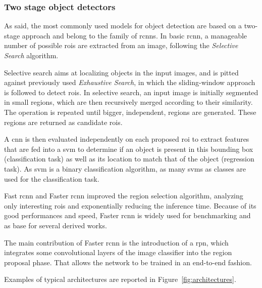 \documentclass[%
    corpo=12pt,
    twoside,
    stile=classica,   
    tipotesi=magistrale,
    evenboxes,
    english,
	numerazioneromana,
]{toptesi}
\begin{document}
\subsubsection{Two stage object detectors}
As said, the most commonly used models for object detection are based on a two-stage approach and belong to the family of \glspl{rcnn}. In basic \gls{rcnn}\cite{girshick2014rich}, a manageable number of possible \glspl{roi} are extracted from an image, following the \textit{Selective Search} algorithm.

Selective search aims at localizing objects in the input images, and is pitted against previously used \textit{Exhaustive Search}, in which the sliding-window approach is followed to detect \glspl{roi}. In selective search, an input image is initially segmented in small regions, which are then recursively merged according to their similarity. The operation is repeated until bigger, independent, regions are generated. These regions are returned as candidate \glspl{roi}.

A \gls{cnn} is then evaluated independently on each proposed \gls{roi} to extract features that are fed into a \gls{svm}
to determine if an object is present in this bounding box (classification task) as well as its location to match that of the object (regression task). As \gls{svm} is a binary classification algorithm, as many \glspl{svm} as classes are used for the classification task.

\medskip
Fast \gls{rcnn}\cite{girshick2015fast} and Faster \gls{rcnn}\cite{ren2016faster} improved the region selection algorithm, analyzing only interesting \glspl{roi} and exponentially reducing the inference time. Because of its good performances and speed, Faster \gls{rcnn} is widely used for benchmarking and as base for several derived works.

The main contribution of Faster \gls{rcnn} is the introduction of a \gls{rpn}, which integrates some convolutional layers of the image classifier into the region proposal phase. That allows the network to be trained in an end-to-end fashion.

Examples of typical architectures are reported in Figure~\ref{fig:architectures}.
\end{document}
